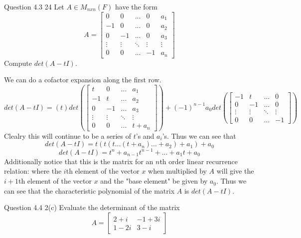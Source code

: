 \documentclass[answers,12pt,addpoints]{exam}
\begin{document}
\begin{questions}
\begin{solution}
    \end{solution}
    \item Question 4.3 24
    Let $A \in M_{nxn}(F)$ have the form 
    $$A = \begin{bmatrix}
        0 & 0 & ... & 0 & a_1 \\
        -1 & 0 & ... & 0 & a_2 \\
        0 & -1 & ... & 0 & a_3 \\
        \vdots & \vdots & \ddots & \vdots & \vdots \\
        0 & 0 & ... & -1 & a_n
    \end{bmatrix}$$
    Compute $det(A-tI)$.
    \begin{solution}
        We can do a cofactor expansion along the first row.
        $$det(A-tI) = (t) det\left(\begin{bmatrix}
            t & 0 & ... & a_1 \\
            -1 & t & ... & a_2 \\
            0 & -1 & ... & a_3 \\
            \vdots & \vdots & \ddots & \vdots \\
            0 & 0 & ... & t+ a_n
        \end{bmatrix} \right) + (-1)^{n-1}a_0 det\left(\begin{bmatrix}
            -1 & t & ... & 0 \\
            0 & -1 & ... & 0 \\
            \vdots & \vdots & \ddots & \vdots \\
            0 & 0 & ... & -1
        \end{bmatrix} \right)$$
        Clealry this will continue to be a series of $t$'s and $a_i$'s. Thus we can see that
        $$det(A-tI) = t (t (t ... (t + a_n) ... + a_2) + a_1  ) + a_0$$
        $$det(A-tI) = t^n + a_{n-1}t^{n-1} + ... + a_1t + a_0$$
        Additionally notice that this is the matrix for an $n$th order linear recurrence relation: where the $i$th element of the vector $x$ when multiplied by $A$ will give the $i+1$th element of the vector $x$ and the "base element" be given by $a_0$. Thus we can see that the characteristic polynomial of the matrix $A$ is $det(A-tI)$.
    \end{solution}
    \item Question 4.4 2(c)
    Evaluate the determinant of the matrix
    $$ A = \begin{bmatrix}
        2 +i & -1 + 3i\\
        1 - 2i & 3 - i
    \end{bmatrix}$$

\end{questions}
\end{document}
